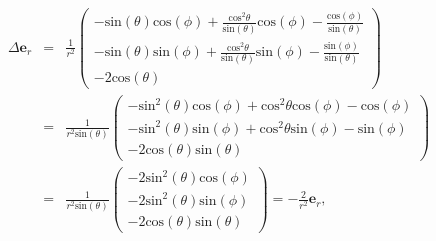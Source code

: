 \documentclass{book}
\renewcommand{\sin}{\text{sin}}
\renewcommand{\cos}{\text{cos}}
\begin{document}
\begin{eqnarray}
\Delta\mathbf{e}_r & = & \frac{1}{r^2}\left(\begin{array}{c}
- \sin\left(\theta\right)\cos\left(\phi\right) + \frac{\cos^2\theta}{\sin\left(\theta\right)}\cos\left(\phi\right) - \frac{\cos\left(\phi\right)}{\sin\left(\theta\right)}\\
- \sin\left(\theta\right)\sin\left(\phi\right) + \frac{\cos^2\theta}{\sin\left(\theta\right)}\sin\left(\phi\right) - \frac{\sin\left(\phi\right)}{\sin\left(\theta\right)}\\
- 2\cos\left(\theta\right)
\end{array}\right)\nonumber\\
& = & \frac{1}{r^2\sin\left(\theta\right)}\left(\begin{array}{c}
- \sin^2\left(\theta\right)\cos\left(\phi\right) + \cos^2\theta\cos\left(\phi\right) - \cos\left(\phi\right)\\
- \sin^2\left(\theta\right)\sin\left(\phi\right) + \cos^2\theta\sin\left(\phi\right) - \sin\left(\phi\right)\\
- 2\cos\left(\theta\right)\sin\left(\theta\right)
\end{array}\right)\nonumber\\
& = & \frac{1}{r^2\sin\left(\theta\right)}\left(\begin{array}{c}
- 2\sin^2\left(\theta\right)\cos\left(\phi\right)\\
- 2\sin^2\left(\theta\right)\sin\left(\phi\right)\\
- 2\cos\left(\theta\right)\sin\left(\theta\right)
\end{array}\right) = -\frac{2}{r^2}\mathbf{e}_r
, \end{eqnarray}
\end{document}
